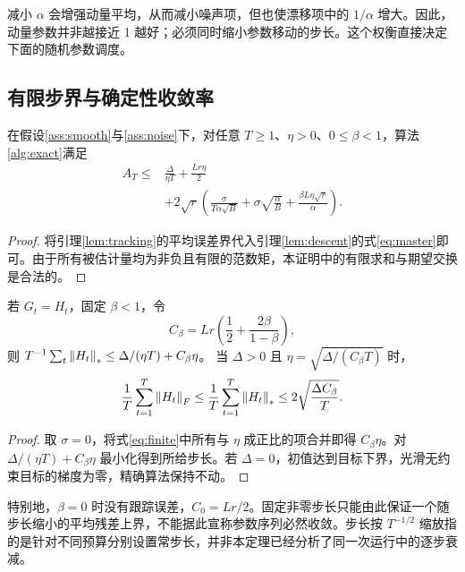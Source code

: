 减小 $\alpha$ 会增强动量平均，从而减小噪声项，但也使漂移项中的 $1/\alpha$ 增大。因此，动量参数并非越接近 1 越好；必须同时缩小参数移动的步长。这个权衡直接决定下面的随机参数调度。

\subsection{有限步界与确定性收敛率}
\begin{theorem}[显式有限步上界]\label{thm:finite}
在假设\ref{ass:smooth}与\ref{ass:noise}下，对任意 $T\geq1$、$\eta>0$、$0\leq\beta<1$，算法\ref{alg:exact}满足
\begin{equation}\label{eq:finite}
 \boxed{\begin{aligned}
 A_T\leq {}&\frac{\Delta}{\eta T}+\frac{Lr\eta}{2}\\
 &+2\sqrt r\left(
 \frac{\sigma}{T\alpha\sqrt B}
 +\sigma\sqrt{\frac{\alpha}{B}}
 +\frac{\beta L\eta\sqrt r}{\alpha}\right).
 \end{aligned}}
\end{equation}
\end{theorem}
\begin{proof}
将引理\ref{lem:tracking}的平均误差界代入引理\ref{lem:descent}的式\eqref{eq:master}即可。由于所有被估计量均为非负且有限的范数矩，本证明中的有限求和与期望交换是合法的。
\end{proof}

\begin{corollary}[确定性情形]\label{cor:det}
若 $G_t=H_t$，固定 $\beta<1$，令
\begin{equation}
 C_\beta=Lr\left(\frac12+\frac{2\beta}{1-\beta}\right),
\end{equation}
则 $T^{-1}\sum_t\left\lVert H_t\right\rVert_*\leq\Delta/(\eta T)+C_\beta\eta$。
当 $\Delta>0$ 且 $\eta=\sqrt{\Delta/(C_\beta T)}$ 时，
\begin{equation}\label{eq:detrate}
 \frac1T\sum_{t=1}^T\left\lVert H_t\right\rVert_F
 \leq\frac1T\sum_{t=1}^T\left\lVert H_t\right\rVert_*
 \leq2\sqrt{\frac{\Delta C_\beta}{T}}.
\end{equation}
\end{corollary}
\begin{proof}
取 $\sigma=0$，将式\eqref{eq:finite}中所有与 $\eta$ 成正比的项合并即得 $C_\beta\eta$。对 $\Delta/(\eta T)+C_\beta\eta$ 最小化得到所给步长。若 $\Delta=0$，初值达到目标下界，光滑无约束目标的梯度为零，精确算法保持不动。
\end{proof}

特别地，$\beta=0$ 时没有跟踪误差，$C_0=Lr/2$。固定非零步长只能由此保证一个随步长缩小的平均残差上界，不能据此宣称参数序列必然收敛。步长按 $T^{-1/2}$ 缩放指的是针对不同预算分别设置常步长，并非本定理已经分析了同一次运行中的逐步衰减。

